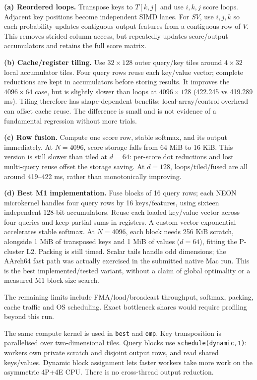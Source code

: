 \documentclass[10pt,a4paper]{article}
\newcommand{\question}[1]{\vspace{1mm}{\large\bfseries #1}\par\vspace{1mm}}
\begin{document}
\textbf{(a) Reordered loops.} Transpose keys to $T[k,j]$ and use $i,k,j$ score loops. Adjacent
key positions become independent SIMD lanes. For $SV$, use $i,j,k$ so each probability
updates contiguous output features from a contiguous row of $V$. This removes strided
column access, but repeatedly updates score/output accumulators and retains the full score matrix.

\textbf{(b) Cache/register tiling.} Use $32\times128$ outer query/key tiles around $4\times32$
local accumulator tiles. Four query rows reuse each key/value vector; complete reductions
are kept in accumulators before storing results. It improves the $4096\times64$ case, but is
slightly slower than loops at $4096\times128$ (422.245 vs 419.289 ms). Tiling therefore has
shape-dependent benefits; local-array/control overhead can offset cache reuse. The difference
is small and is not evidence of a fundamental regression without more trials.

\textbf{(c) Row fusion.} Compute one score row, stable softmax, and its output immediately.
At $N=4096$, score storage falls from 64 MiB to 16 KiB. This version is still slower than
tiled at $d=64$: per-score dot reductions and lost multi-query reuse offset the storage saving.
At $d=128$, loops/tiled/fused are all around 419--422 ms, rather than monotonically improving.

\textbf{(d) Best M1 implementation.} Fuse blocks of 16 query rows; each NEON microkernel handles
four query rows by 16 keys/features, using sixteen independent 128-bit accumulators. Reuse
each loaded key/value vector across four queries and keep partial sums in registers.
A custom vector exponential accelerates stable softmax. At $N=4096$, each block needs 256 KiB
scratch, alongside 1 MiB of transposed keys and 1 MiB of values ($d=64$), fitting the P-cluster
L2. Packing is still timed. Scalar tails handle odd dimensions; the AArch64 fast path was
actually exercised in the submitted native Mac run. This is the best implemented/tested
variant, without a claim of global optimality or a measured M1 block-size search.

The remaining limits include FMA/load/broadcast throughput, softmax, packing, cache traffic
and OS scheduling. Exact bottleneck shares would require profiling beyond this run.
\newpage
\question{Q4. OpenMP}
The same compute kernel is used in \texttt{best} and \texttt{omp}. Key transposition is parallelised
over two-dimensional tiles. Query blocks use \texttt{schedule(dynamic,1)}: workers own private
scratch and disjoint output rows, and read shared keys/values. Dynamic block assignment lets
faster workers take more work on the asymmetric 4P+4E CPU. There is no cross-thread output reduction.
\end{document}
